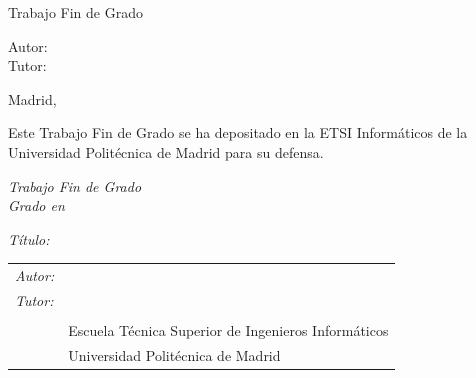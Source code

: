 \begin{titlepage}
  \vspace*{1cm}
  \begin{center}
    \huge{ Trabajo Fin de Grado}%
  \end{center}

  \vspace*{0.5cm}
  \begin{center}
    \huge\bfseries {  \TituloTFG{} }
  \end{center}

  \vspace*{5cm}

  \noindent
  \large{Autor: \NombreAutor{} }\\
  \large{Tutor: \NombreTutor{} }


  \vspace*{4cm}
  \begin{center}
    Madrid, \Fecha
  \end{center}

  \newpage
  \thispagestyle{empty}
  \noindent
  Este Trabajo Fin de Grado se ha depositado en la ETSI Informáticos de la Universidad Politécnica de Madrid para su defensa.

  \vspace*{4cm}
  \noindent
  \textit{Trabajo Fin de Grado}\\
  \textit{Grado en} \Grado{}
  
  \textit{Título:} \TituloTFG{}

  \Fecha

  \vspace*{3cm}

  \noindent
  \begin{tabular}{ll}
     \textit{Autor:} & \NombreAutor{}  \\
     \textit{Tutor:} & \NombreTutor{}  \\
     & \Departamento{} \\
     & Escuela Técnica Superior de Ingenieros Informáticos\\
     & Universidad Politécnica de Madrid
  \end{tabular}

\end{titlepage}
